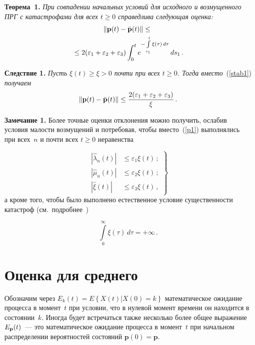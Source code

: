 \begin{multicols}{2}
\bigskip

\noindent
\textbf{Теорема~1.} \textit{При совпадении начальных условий для исходного и возмущенного 
ПРГ с катастрофами для всех $t \ge 0$ справедлива следующая оценка:}
\begin{multline}
\left\|{\mathbf p}(t)-\bar{{\mathbf p}}(t)\right\|\le{}\\
{}\le
2(\varepsilon_1+\varepsilon_2+\varepsilon_3)\int_0^t e^{-\int\limits_{s_1}^t \xi(\tau)\,d\tau} \, d{s_1}\,.
\label{stab1}
\end{multline}

\bigskip


\noindent
\textbf{Следствие 1.} \textit{Пусть $\xi(t) \ge \xi >0$ почти при всех $t \ge 0$. Тогда вместо}~(\ref{stab1}) 
\textit{получаем}
\begin{equation*}
\left\|{\mathbf p}(t)-\bar{{\mathbf p}}(t)\right\|\le \displaystyle\frac{\displaystyle 2(\varepsilon_1+\varepsilon_2+\varepsilon_3)\mathstrut}{\displaystyle \xi\mathstrut}\,.
\end{equation*}

\bigskip

\noindent
\textbf{Замечание 1.} Более точные оценки отклонения можно получить, ослабив условия малости 
возмущений и потребовав, чтобы 
вместо~(\ref{p1})  выполнялись при всех~$n$ и почти всех $t \ge 0$  неравенства
\pagebreak

\noindent
\begin{equation}
\left.
\begin{array}{rl}
\left|\hat{\lambda}_n(t)\right| &\le \varepsilon_1\xi(t)\,; \\[9pt]
\left|\hat{\mu}_n(t)\right| &\le \varepsilon_2\xi(t)\,;\\[9pt] 
 \left|\hat{\xi}(t)\right| &\le \varepsilon_3\xi(t)\,,
 \end{array}
 \right \}
\label{p1'}
\end{equation}
а кроме того, чтобы было выполнено естественное условие существенности катастроф
(см.\ подробнее~\cite{z98})

\noindent
\begin{equation}
\int\limits_0^\infty  \xi(\tau)\,d\tau = +\infty\,.
\label{ek1}
\end{equation}


\section{Оценка для среднего}

Обозначим через $E_k(t) = E\left\{X(t)\left|X(0)=k\right.\right\}$ математическое ожидание процесса в момент~$t$ 
при условии, что в нулевой момент времени он находится в состоянии~$k$. Иногда будет встречаться также несколько 
более общее выражение $E_{\bf p}(t)$~--- это математическое ожидание процесса в момент~$t$ 
при начальном распределении вероятностей состояний ${\mathbf p}(0) = {\mathbf p}$.


\end{multicols}

